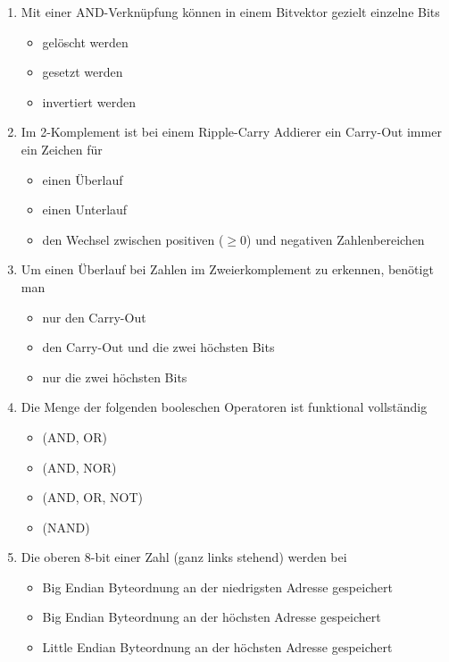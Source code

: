 \documentclass{exercisesheet}
\begin{document}
\begin{enumerate}
\begin{itemize}
        \end{itemize}
  \item Mit einer AND-Verknüpfung können in einem Bitvektor gezielt einzelne Bits
        \begin{itemize}
          \item gelöscht werden \checkmark
          \item gesetzt werden
          \item invertiert werden
        \end{itemize}
  \item Im 2-Komplement ist bei einem Ripple-Carry Addierer ein Carry-Out immer ein Zeichen für
        \begin{itemize}
          \item einen Überlauf \checkmark
          \item einen Unterlauf
          \item den Wechsel zwischen positiven ($\geq 0$) und negativen Zahlenbereichen
        \end{itemize}
  \item Um einen Überlauf bei Zahlen im Zweierkomplement zu erkennen, benötigt man
        \begin{itemize}
          \item nur den Carry-Out
          \item den Carry-Out und die zwei höchsten Bits \checkmark
          \item nur die zwei höchsten Bits
        \end{itemize}
  \item Die Menge der folgenden booleschen Operatoren ist funktional vollständig
        \begin{itemize}
          \item (AND, OR) \checkmark
          \item (AND, NOR) \checkmark
          \item (AND, OR, NOT) \checkmark
          \item (NAND)
        \end{itemize}
  \item Die oberen 8-bit einer Zahl (ganz links stehend) werden bei
        \begin{itemize}
          \item Big Endian Byteordnung an der niedrigsten Adresse gespeichert \checkmark
          \item Big Endian Byteordnung an der höchsten Adresse gespeichert
          \item Little Endian Byteordnung an der höchsten Adresse gespeichert \checkmark

\end{itemize}
\end{enumerate}
\end{document}
